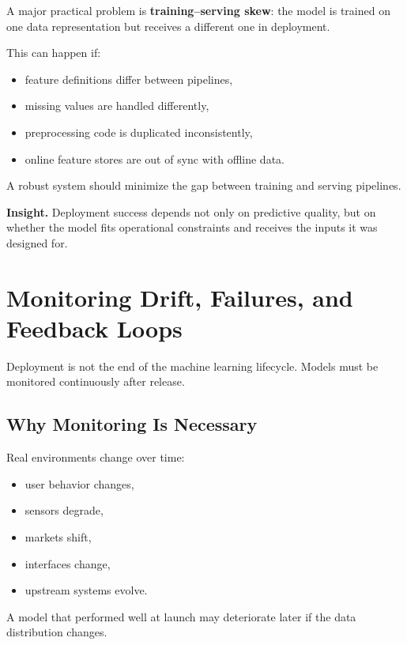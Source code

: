 A major practical problem is \textbf{training--serving skew}: the model is trained on one data representation but receives a different one in deployment.

\medskip

\noindent
This can happen if:
\begin{itemize}
    \item feature definitions differ between pipelines,
    \item missing values are handled differently,
    \item preprocessing code is duplicated inconsistently,
    \item online feature stores are out of sync with offline data.
\end{itemize}

\medskip

\noindent
A robust system should minimize the gap between training and serving pipelines.

\medskip

\noindent
\textbf{Insight.}
Deployment success depends not only on predictive quality, but on whether the model fits operational constraints and receives the inputs it was designed for.

\section{Monitoring Drift, Failures, and Feedback Loops}

Deployment is not the end of the machine learning lifecycle. Models must be monitored continuously after release.

\subsection{Why Monitoring Is Necessary}

Real environments change over time:
\begin{itemize}
    \item user behavior changes,
    \item sensors degrade,
    \item markets shift,
    \item interfaces change,
    \item upstream systems evolve.
\end{itemize}

\medskip

\noindent
A model that performed well at launch may deteriorate later if the data distribution changes.

